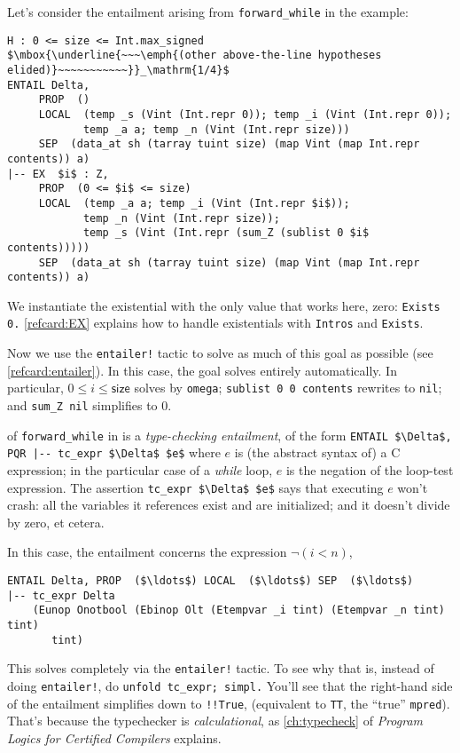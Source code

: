 \documentclass[12pt,fleqn,openany,oneside,showtrims]{memoir}
\begin{document}
Let's consider the entailment arising from \lstinline{forward_while}
in the \linebreak {} example:
\begin{lstlisting}
H : 0 <= size <= Int.max_signed
$\mbox{\underline{~~~\emph{(other above-the-line hypotheses elided)}~~~~~~~~~~~}}_\mathrm{1/4}$
ENTAIL Delta,
     PROP  ()
     LOCAL  (temp _s (Vint (Int.repr 0)); temp _i (Vint (Int.repr 0));
            temp _a a; temp _n (Vint (Int.repr size)))
     SEP  (data_at sh (tarray tuint size) (map Vint (map Int.repr contents)) a)
|-- EX  $i$ : Z,
     PROP  (0 <= $i$ <= size)
     LOCAL  (temp _a a; temp _i (Vint (Int.repr $i$));
            temp _n (Vint (Int.repr size));
            temp _s (Vint (Int.repr (sum_Z (sublist 0 $i$ contents)))))
     SEP  (data_at sh (tarray tuint size) (map Vint (map Int.repr contents)) a)
\end{lstlisting}
We instantiate the existential with the only value that works here, zero:
\lstinline{Exists 0.}
\autoref{refcard:EX} explains how to handle existentials with
\lstinline{Intros} and \lstinline{Exists}.

Now we use the \lstinline{entailer!} tactic to solve as much of this goal
as possible (see \autoref{refcard:entailer}). In this case, the goal solves
entirely automatically.
In particular, $0\le i \le \mathsf{size}$ solves by \lstinline{omega};
\lstinline{sublist 0 0 contents} rewrites to \lstinline{nil};
and \lstinline{sum_Z nil} simplifies to 0.

 of \lstinline{forward_while}
in  is a \emph{type-checking entailment},
of the form
\lstinline{ENTAIL $\Delta$, PQR |-- tc_expr $\Delta$ $e$}\newline
where $e$ is (the abstract syntax of) a C expression;
in the particular case of a \emph{while} loop, $e$
is the negation of the loop-test expression.
The assertion \lstinline{tc_expr $\Delta$ $e$}
says that executing $e$ won't crash: all the variables it references
exist and are initialized; and it doesn't divide by zero, et cetera.

In this case, the entailment concerns the expression
$\neg(i<n)$,
\begin{lstlisting}
ENTAIL Delta, PROP  ($\ldots$) LOCAL  ($\ldots$) SEP  ($\ldots$)
|-- tc_expr Delta
    (Eunop Onotbool (Ebinop Olt (Etempvar _i tint) (Etempvar _n tint) tint)
       tint)
\end{lstlisting}
This solves completely via the \lstinline{entailer!} tactic.
To see why that is, instead of doing \lstinline{entailer!},
do \lstinline{unfold tc_expr; simpl.}  You'll see that the
right-hand side of the entailment simplifies down to \lstinline{!!True},
(equivalent to \lstinline{TT}, the ``true'' \lstinline{mpred}).
That's because the typechecker is \emph{calculational},
as \autoref{ch:typecheck} of \emph{Program Logics for Certified Compilers} explains.
\end{document}
